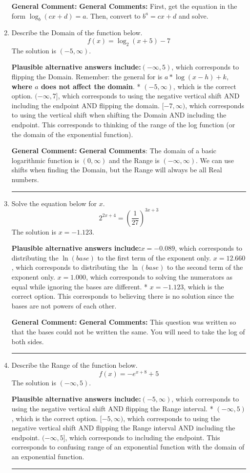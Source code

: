 \documentclass{extbook}[14pt]
\newcommand{\litem}[1]{\item #1

\rule{\textwidth}{0.4pt}}
\begin{document}
\begin{enumerate}
{\textbf{General Comment:} \textbf{General Comments:} First, get the equation in the form $\log_b{(cx+d)} = a$. Then, convert to $b^a = cx+d$ and solve.
}
\litem{
Describe the Domain of the function below.
\[ f(x) = \log_2{(x+5)}-7 \]The solution is \( (-5, \infty) \).\begin{enumerate}[label=\Alph*.]
\textbf{Plausible alternative answers include:}$(-\infty, 5)$, which corresponds to flipping the Domain. Remember: the general for is $a*\log(x-h)+k$, \textbf{where $a$ does not affect the domain}.
* $(-5, \infty)$, which is the correct option.
$(-\infty, 7]$, which corresponds to using the negative vertical shift AND including the endpoint AND flipping the domain.
$[-7, \infty)$, which corresponds to using the vertical shift when shifting the Domain AND including the endpoint.
This corresponds to thinking of the range of the log function (or the domain of the exponential function).
\end{enumerate}

\textbf{General Comment:} \textbf{General Comments}: The domain of a basic logarithmic function is $(0, \infty)$ and the Range is $(-\infty, \infty)$. We can use shifts when finding the Domain, but the Range will always be all Real numbers.
}
\litem{
Solve the equation below for $x$.
\[ 2^{2x+4} = \left(\frac{1}{27}\right)^{3x+3} \]The solution is \( x = -1.123 \).\begin{enumerate}[label=\Alph*.]
\textbf{Plausible alternative answers include:}$x = -0.089$, which corresponds to distributing the $\ln(base)$ to the first term of the exponent only.
$x = 12.660$, which corresponds to distributing the $\ln(base)$ to the second term of the exponent only.
$x = 1.000$, which corresponds to solving the numerators as equal while ignoring the bases are different.
* $x = -1.123$, which is the correct option.
This corresponds to believing there is no solution since the bases are not powers of each other.
\end{enumerate}

\textbf{General Comment:} \textbf{General Comments:} This question was written so that the bases could not be written the same. You will need to take the log of both sides.
}
\litem{
Describe the Range of the function below.
\[ f(x) = -e^{x+8}+5 \]The solution is \( (-\infty, 5) \).\begin{enumerate}[label=\Alph*.]
\textbf{Plausible alternative answers include:}$(-5, \infty)$, which corresponds to using the negative vertical shift AND flipping the Range interval.
* $(-\infty, 5)$, which is the correct option.
$[-5, \infty)$, which corresponds to using the negative vertical shift AND flipping the Range interval AND including the endpoint.
$(-\infty, 5]$, which corresponds to including the endpoint.
This corresponds to confusing range of an exponential function with the domain of an exponential function.
\end{enumerate}

}
\end{enumerate}
\end{document}
